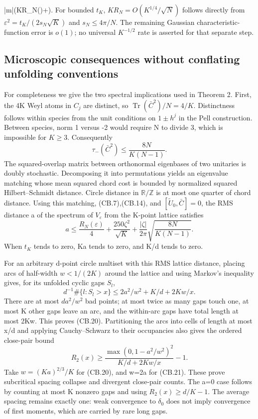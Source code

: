  |m|\left(KR_N(\varepsilon)+\right).    
\] For bounded \(t_{K}\), \(KR_N=O(K^{1/4}/\sqrt N)\) follows directly from \(\varepsilon^2=t_K/(2s_N\sqrt K)\) and \(s_N\leq4\pi/N\). The remaining Gaussian characteristic-function error is \(o(1)\); no universal \(K^{-1/2}\) rate is asserted for that separate step.

\subsection{Microscopic consequences without conflating unfolding conventions}\label{coboundary:microscopic-consequences-without-conflating-unfolding-conventions}

For completeness we give the two spectral implications used in Theorem 2. First, the 4K Weyl atoms in \(C_{j}\) are distinct, so \(\operatorname{Tr}(\bar C^2)/N=4/K\). Distinctness follows within species from the unit conditions on \(1\pm h^j\) in the Pell construction. Between species, norm 1 versus -2 would require N to divide 3, which is impossible for \(K\geq3\). Consequently \[
 \tau_-(\bar C^2)\leq\frac{8N}{K(N-1)}.
\] The squared-overlap matrix between orthonormal eigenbases of two unitaries is doubly stochastic. Decomposing it into permutations yields an eigenvalue matching whose mean squared chord cost is bounded by normalized squared Hilbert--Schmidt distance. Circle distance in \(\mathbb R/\mathbb Z\) is at most one quarter of chord distance. Using this matching, (CB.7),(CB.14), and \([\widetilde U_0,\bar C]=0\), the RMS distance a of the spectrum of \(V_{\varepsilon}\) from the K-point lattice satisfies \[
 a\leq\frac{R_N(\varepsilon)}4+
          \frac{250\zeta^2}{\sqrt K}+
          \frac{|\zeta|}{2\pi}\sqrt{\frac{8N}{K(N-1)}}.         \tag{CB.19}
\] When \(t_{K}\) tends to zero, Ka tends to zero, and K/d tends to zero.

For an arbitrary d-point circle multiset with this RMS lattice distance, placing arcs of half-width \(w<1/(2K)\) around the lattice and using Markov's inequality gives, for its unfolded cyclic gaps \(S_{l}\), \[
 d^{-1}\#\{l:S_l>x\}\leq2a^2/w^2+K/d+2Kw/x.                  \tag{CB.20}
\] There are at most \(da^2/w^2\) bad points; at most twice as many gaps touch one, at most K other gaps leave an arc, and the within-arc gaps have total length at most 2Kw. This proves (CB.20). Partitioning the arcs into cells of length at most x/d and applying Cauchy--Schwarz to their occupancies also gives the ordered close-pair bound \[
 R_2(x)\geq\frac{\max(0,1-a^2/w^2)^2}{K/d+2Kw/x}-1.           \tag{CB.21}
\] Take \(w=(Ka)^{2/3}/K\) for (CB.20), and w=2a for (CB.21). These prove subcritical spacing collapse and divergent close-pair counts. The a=0 case follows by counting at most K nonzero gaps and using \(R_2(x)\geq d/K-1\). The average spacing remains exactly one: weak convergence to \(\delta_{0}\) does not imply convergence of first moments, which are carried by rare long gaps.

